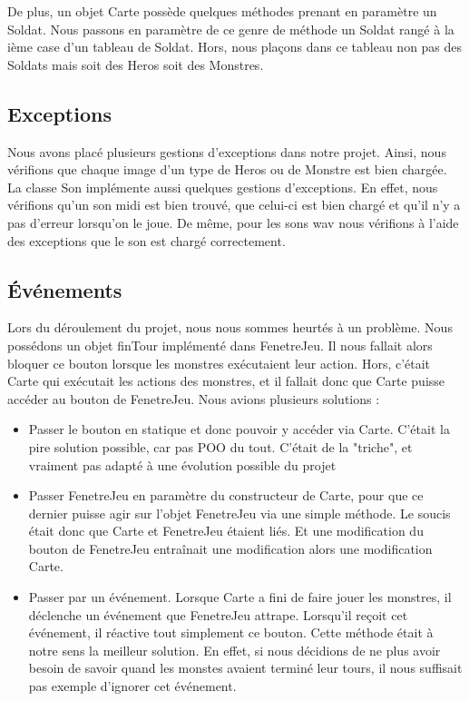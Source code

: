 \documentclass{article}
\begin{document}
  De plus, un objet Carte possède quelques méthodes prenant en paramètre un Soldat.
  Nous passons en paramètre de ce genre de méthode un Soldat rangé à la ième case d'un tableau de Soldat.
  Hors, nous plaçons dans ce tableau non pas des Soldats mais soit des Heros soit des Monstres.

  \subsection{Exceptions}
  Nous avons placé plusieurs gestions d'exceptions dans notre projet.
  Ainsi, nous vérifions que chaque image d'un type de Heros ou de Monstre est bien chargée.
  La classe Son implémente aussi quelques gestions d'exceptions.
  En effet, nous vérifions qu'un son midi est bien trouvé, que celui-ci est bien chargé et qu'il n'y a pas d'erreur lorsqu'on le joue.
  De même, pour les sons wav nous vérifions à l'aide des exceptions que le son est chargé correctement.

  \subsection{Événements}
  Lors du déroulement du projet, nous nous sommes heurtés à un problème.
  Nous possédons un objet finTour implémenté dans FenetreJeu.
  Il nous fallait alors bloquer ce bouton lorsque les monstres exécutaient leur action.
  Hors, c'était Carte qui exécutait les actions des monstres, et il fallait donc que Carte puisse accéder au bouton de FenetreJeu.
  Nous avions plusieurs solutions :
  \begin{itemize}
    \item Passer le bouton en statique et donc pouvoir y accéder via Carte. C'était la pire solution possible, car pas POO du tout.
    C'était de la "triche", et vraiment pas adapté à une évolution possible du projet
    \item Passer FenetreJeu en paramètre du constructeur de Carte, pour que ce dernier puisse agir sur l'objet FenetreJeu via une simple méthode.
    Le soucis était donc que Carte et FenetreJeu étaient liés. Et une modification du bouton de FenetreJeu entraînait une modification alors une modification Carte.
    \item Passer par un événement. Lorsque Carte a fini de faire jouer les monstres, il déclenche un événement que FenetreJeu attrape.
    Lorsqu'il reçoit cet événement, il réactive tout simplement ce bouton. Cette méthode était à notre sens la meilleur solution.
    En effet, si nous décidions de ne plus avoir besoin de savoir quand les monstes avaient terminé leur tours, il nous suffisait pas exemple d'ignorer cet événement.
  \end{itemize}
 
\end{document}
